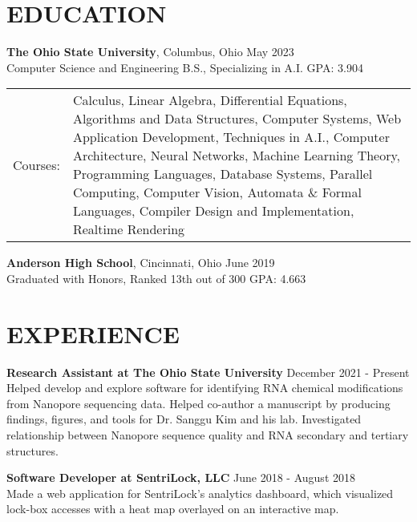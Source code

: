 \documentclass[line, margin]{res}
\begin{document}
\address{manganaris.2@buckeyemail.osu.edu \\ 8590 St. Ives Pl., Cincinnati, Ohio 45255 \\ (513) 432-1399}


\begin{resume}

  \section{EDUCATION}

  \textbf{The Ohio State University}, Columbus, Ohio \hfill May 2023 \\
  Computer Science and Engineering B.S., Specializing in A.I. \hfill GPA: 3.904 \\
  \begin{tabular}{m{0.8in} p{4in}}
    Courses: & Calculus, Linear Algebra, Differential
    Equations, Algorithms and Data Structures, Computer Systems, Web
    Application Development, Techniques in A.I., Computer
    Architecture, Neural Networks, Machine Learning Theory,
    Programming Languages, Database Systems, Parallel Computing,
    Computer Vision, Automata \& Formal Languages, Compiler Design and
    Implementation, Realtime Rendering \\
  \end{tabular}

  \textbf{Anderson High School}, Cincinnati, Ohio \hfill June 2019 \\
  Graduated with Honors, Ranked 13th out of 300 \hfill GPA: 4.663 \\

  \section{EXPERIENCE}

  \textbf{Research Assistant at The Ohio State University} \hfill December 2021 - Present \\
  Helped develop and explore software for identifying RNA chemical
  modifications from Nanopore sequencing data. Helped co-author a manuscript by
  producing findings, figures, and tools for Dr. Sanggu Kim and his
  lab. Investigated relationship between Nanopore sequence quality and
  RNA secondary and tertiary structures.

  \textbf{Software Developer at SentriLock, LLC} \hfill June 2018 - August 2018 \\
  Made a web application for SentriLock's analytics dashboard, which visualized
  lock-box accesses with a heat map overlayed on an interactive map. \\


\end{resume}
\end{document}
